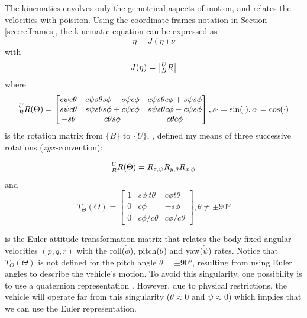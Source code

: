 \par The kinematics envolves only the gemotrical aspects of motion, and relates the velocities with poisiton. Using the coordinate frames notation in Section \ref{sec:refframes}, the kinematic equation can be expressed as
\begin{equation}
    \dot{\eta} = J(\eta)\nu
\end{equation}
with 
\begin{equation}
    J(\eta) = \begin{bmatrix}
        \prescript{U}{B}{R}
    \end{bmatrix}
\end{equation}
where
\begin{equation}
    \prescript{U}{B}{R(\Theta)} = \begin{bmatrix}
        c\psi c\theta & c\psi s\theta s\phi-s \psi c\phi & c\psi s\theta c\phi+s\psi s\phi \\
        s\psi c\theta & s\psi s\theta s\phi+c\psi c\phi & s\psi s\theta c\phi-c\psi s\phi \\
        -s\theta & c\theta s\phi & c\theta c\phi
    \end{bmatrix}, s\cdot = \sin(\cdot), c\cdot=\cos(\cdot)
\end{equation}
is the rotation matrix from $\{B\}$ to $\{U\}$, \cite{fossen2006nonlinear}, defined my means of three successive rotations ($zyx$-convention):

\begin{equation}
    \prescript{U}{B}{R(\Theta)} = R_{z,\psi}R_{y,\theta}R_{x,\phi}
\end{equation}
and
\begin{equation}
    T_{\Theta}(\Theta) = \begin{bmatrix}
        1 & s\phi\ t\theta & c\phi t\theta \\
        0 & c\phi & -s\phi \\
        0 & c\phi / c\theta & c\phi / c\theta 
    \end{bmatrix}, \theta \neq \pm 90º
\end{equation}

is the Euler attitude transformation matrix that relates the body-fixed angular velocities $(p, q, r)$ with the roll($\dot{\phi}$), pitch($\dot{\theta}$) and yaw($\dot{\psi}$) rates. Notice that $T_\Theta(\Theta)$ is not defined for the pitch angle $\theta = \pm90º$, resulting from using Euler angles to describe the vehicle’s motion. To avoid this singularity, one possibility is to use a quaternion representation \cite{fossen2006nonlinear}. However, due to physical restrictions, the vehicle will operate far from this singularity ($\theta\approx 0$ and $\psi \approx 0$) which implies that we can use the Euler representation.


